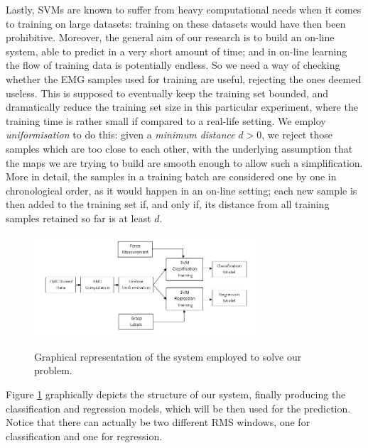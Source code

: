 Lastly, SVMs are known to suffer from heavy computational needs when
it comes to training on large datasets: training on these datasets
would have then been prohibitive. Moreover, the general aim of our
research is to build an on-line system, able to predict in a very
short amount of time; and in on-line learning the flow of training
data is potentially endless. So we need a way of checking whether the
EMG samples used for training are useful, rejecting the ones deemed
useless. This is supposed to eventually keep the training set bounded,
and dramatically reduce the training set size in this particular
experiment, where the training time is rather small if compared to a
real-life setting. We employ \emph{uniformisation}
\cite{2008.ICRA,2008.BioCyb} to do this: given a \emph{minimum
distance} $d > 0$, we reject those samples which are too close to each
other, with the underlying assumption that the maps we are trying to
build are smooth enough to allow such a simplification. More in
detail, the samples in a training batch are considered one by one in
chronological order, as it would happen in an on-line setting; each
new sample is then added to the training set if, and only if, its
distance from all training samples retained so far is at least
$d$.

\begin{figure}[!ht] \centering
  \includegraphics[width=0.75\textwidth]{figs/Schema} \\
  \caption{Graphical representation of the system employed to solve our problem.}
  \label{fig:Algorithm}
\end{figure}

Figure \ref{fig:Algorithm} graphically depicts the structure of our
system, finally producing the classification and regression models,
which will be then used for the prediction. Notice that there can
actually be two different RMS windows, one for classification and one
for regression.
